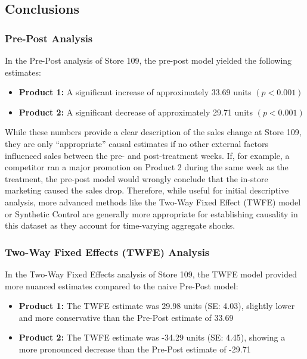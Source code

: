 \documentclass[
  letterpaper,
  DIV=11,
  numbers=noendperiod]{scrartcl}
\providecommand{\tightlist}{%
  \setlength{\itemsep}{0pt}\setlength{\parskip}{0pt}}
\begin{document}
\subsection{Conclusions}\label{conclusions}

\subsubsection{Pre-Post Analysis}\label{pre-post-analysis}

In the Pre-Post analysis of Store 109, the pre-post model yielded the
following estimates:

\begin{itemize}
\tightlist
\item
  \textbf{Product 1:} A significant increase of approximately 33.69
  units \((p<0.001)\)
\item
  \textbf{Product 2:} A significant decrease of approximately 29.71
  units \((p<0.001)\)
\end{itemize}

While these numbers provide a clear description of the sales change at
Store 109, they are only ``appropriate'' causal estimates if no other
external factors influenced sales between the pre- and post-treatment
weeks. If, for example, a competitor ran a major promotion on Product 2
during the same week as the treatment, the pre-post model would wrongly
conclude that the in-store marketing caused the sales drop. Therefore,
while useful for initial descriptive analysis, more advanced methods
like the Two-Way Fixed Effect (TWFE) model or Synthetic Control are
generally more appropriate for establishing causality in this dataset as
they account for time-varying aggregate shocks.

\subsubsection{Two-Way Fixed Effects (TWFE)
Analysis}\label{two-way-fixed-effects-twfe-analysis}

In the Two-Way Fixed Effects analysis of Store 109, the TWFE model
provided more nuanced estimates compared to the naive Pre-Post model:

\begin{itemize}
\tightlist
\item
  \textbf{Product 1:} The TWFE estimate was 29.98 units (SE: 4.03),
  slightly lower and more conservative than the Pre-Post estimate of
  33.69
\item
  \textbf{Product 2:} The TWFE estimate was -34.29 units (SE: 4.45),
  showing a more pronounced decrease than the Pre-Post estimate of
  -29.71
\end{itemize}
\end{document}
